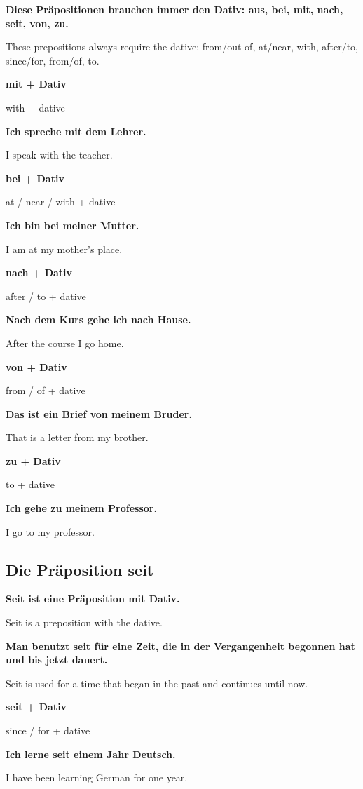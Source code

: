 \documentclass[a4paper]{article}
\newcommand{\EN}[1]{\par{\small\textcolor{TranslationGray}{#1}}\vspace{0.4em}}
\begin{document}
            \textbf{Diese Präpositionen brauchen immer den Dativ: aus, bei, mit, nach, seit, von, zu.}
            \EN{These prepositions always require the dative: from/out of, at/near, with, after/to, since/for, from/of, to.}
            
            \textbf{mit + Dativ}
            \EN{with + dative}
            
            \textbf{Ich spreche mit dem Lehrer.}
            \EN{I speak with the teacher.}
            
            \textbf{bei + Dativ}
            \EN{at / near / with + dative}
            
            \textbf{Ich bin bei meiner Mutter.}
            \EN{I am at my mother's place.}
            
            \textbf{nach + Dativ}
            \EN{after / to + dative}
            
            \textbf{Nach dem Kurs gehe ich nach Hause.}
            \EN{After the course I go home.}
            
            \textbf{von + Dativ}
            \EN{from / of + dative}
            
            \textbf{Das ist ein Brief von meinem Bruder.}
            \EN{That is a letter from my brother.}
            
            \textbf{zu + Dativ}
            \EN{to + dative}
            
            \textbf{Ich gehe zu meinem Professor.}
            \EN{I go to my professor.}
        
        \subsection{Die Präposition seit}
            
            \textbf{Seit ist eine Präposition mit Dativ.}
            \EN{Seit is a preposition with the dative.}
            
            \textbf{Man benutzt seit für eine Zeit, die in der Vergangenheit begonnen hat und bis jetzt dauert.}
            \EN{Seit is used for a time that began in the past and continues until now.}
            
            \textbf{seit + Dativ}
            \EN{since / for + dative}
            
            \textbf{Ich lerne seit einem Jahr Deutsch.}
            \EN{I have been learning German for one year.}
            
\end{document}
